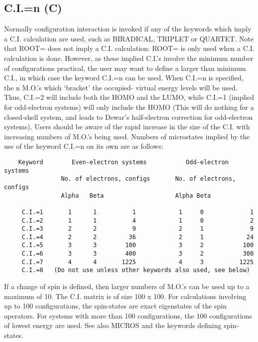 \documentclass[11pt]{book}
\newcommand{\mi}[1]{#1\index{#1}}
\begin{document}
\subsection*{C.I.=n (C)}
   Normally configuration interaction is invoked if any of the keywords
   which imply a \mi{C.I.} calculation are used, such as BIRADICAL, TRIPLET or
   QUARTET.  Note that ROOT= does not imply a  C.I. calculation:   ROOT=  is
   only  used  when  a  C.I. calculation is done.  However, as these implied
   C.I.'s involve the minimum number of configurations practical,  the  user
   may  want to define a larger than minimum C.I., in which case the keyword
   C.I.=n can be used.   When  C.I.=n  is  specified,  the  n  M.O.'s  which
   `bracket' the occupied- virtual energy levels will be used.  Thus, C.I.=2
   will include both the HOMO  and  the  LUMO,  while  C.I.=1  (implied  for
   odd-electron  systems)  will  only include the HOMO (This will do nothing
   for a closed-shell system, and leads to Dewar's half-electron  correction
   for  odd-electron  systems).  Users should be aware of the rapid increase
   in the size of the C.I. with increasing numbers  of  M.O.'s  being  used.
   Numbers  of  microstates  implied by the use of the keyword C.I.=n on its
   own are as follows:                    
\begin{verbatim}
    Keyword        Even-electron systems           Odd-electron systems
                No. of electrons, configs       No. of electrons, configs
                Alpha   Beta                    Alpha Beta
    
     C.I.=1       1      1          1            1     0             1
     C.I.=2       1      1          4            1     0             2
     C.I.=3       2      2          9            2     1             9
     C.I.=4       2      2         36            2     1            24
     C.I.=5       3      3        100            3     2           100
     C.I.=6       3      3        400            3     2           300
     C.I.=7       4      4       1225            4     3          1225
     C.I.=8   (Do not use unless other keywords also used, see below)
\end{verbatim}
    
    If a change of spin is defined, then larger numbers of M.O.'s can be
used  up  to a maximum of 10.  The C.I. matrix is of size 100 x 100.  For
calculations involving up to  100  configurations,  the  spin-states  are
exact  eigenstates of the spin operators.  For systems with more than 100
configurations, the 100 configurations of lowest energy  are  used.   See
also MICROS and the keywords defining spin-states.
\end{document}
